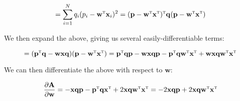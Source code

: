 \documentclass[a4paper,10pt,english]{article}
\begin{document}
\begin{equation*}
= \sum_{i=1}^{N} q_i ( p_i - \mathbf{w}^\textsc{t} \mathbf{x}_i )^2 = (\mathbf{p} - \mathbf{w}^\textsc{t} \mathbf{x}^\textsc{t})^\textsc{t}\mathbf{q}(\mathbf{p} - \mathbf{w}^\textsc{t} \mathbf{x}^\textsc{t})
\end{equation*}

We then expand the above, giving us several easily-differentiable terms:

\begin{equation*}
= (\mathbf{p}^\textsc{t}\mathbf{q} - \mathbf{w} \mathbf{x} \mathbf{q})(\mathbf{p} - \mathbf{w}^\textsc{t} \mathbf{x}^\textsc{t}) = \mathbf{p}^\textsc{t}\mathbf{q}\mathbf{p} - \mathbf{w} \mathbf{x} \mathbf{q}\mathbf{p} - \mathbf{p}^\textsc{t}\mathbf{q}\mathbf{w}^\textsc{t} \mathbf{x}^\textsc{t} + \mathbf{w} \mathbf{x} \mathbf{q}\mathbf{w}^\textsc{t} \mathbf{x}^\textsc{t}
\end{equation*}

We can then differentiate the above with respect to $\mathbf{w}$:

\begin{equation*}
\frac{\partial \mathbf{A}}{\partial \mathbf{w}} =  -\mathbf{x} \mathbf{q}\mathbf{p} - \mathbf{p}^\textsc{t}\mathbf{q} \mathbf{x}^\textsc{t} + 2 \mathbf{x} \mathbf{q}\mathbf{w}^\textsc{t} \mathbf{x}^\textsc{t} = -2 \mathbf{x} \mathbf{q} \mathbf{p} + 2 \mathbf{x} \mathbf{q} \mathbf{w}^\textsc{t} \mathbf{x}^\textsc{t} 
\end{equation*}
\end{document}
